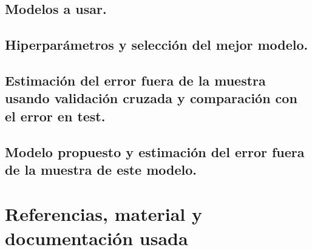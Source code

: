 \documentclass[12pt, spanish]{article}
\begin{document}
\subsection{Modelos a usar.}

\subsection{Hiperparámetros y selección del mejor modelo.}

\subsection{Estimación del error fuera de la muestra usando validación cruzada y comparación con el error en test.}

\subsection{Modelo propuesto y estimación del error fuera de la muestra de este modelo.}


\newpage


\section{Referencias, material y documentación usada}
\end{document}

